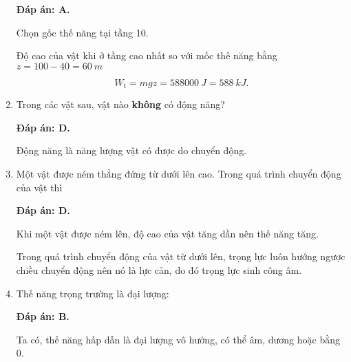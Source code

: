 \begin{enumerate}[label=\bfseries Câu \arabic*:, leftmargin=1.5cm]
	\hideall
	{	
		\textbf{Đáp án: A.}
		
		Chọn gốc thế năng tại tầng 10.
		
		Độ cao của vật khi ở tầng cao nhất so với mốc thế năng bằng $z = 100 - 40 = \SI{60}{m}$ 
		
		$$W_\text{t} = mgz = \SI{588000}{J} = \SI{588}{kJ}.$$
	}
	\item {}
	
	
	{Trong các vật sau, vật nào \textbf{không} có động năng?
	}
	
	\hideall
	{	
		\textbf{Đáp án: D.}
		
		Động năng là năng lượng vật có được do chuyển động.
	}
	\item {}
	
	
	{Một vật được ném thẳng đứng từ dưới lên cao. Trong quá trình chuyển động của vật thì
	}
	
	\hideall
	{	
		\textbf{Đáp án: D.}
		
		Khi một vật được ném lên, độ cao của vật tăng dần nên thế năng tăng.
		
		Trong quá trình chuyển động của vật từ dưới lên, trọng lực luôn hướng ngược chiều chuyển động nên nó là lực cản, do đó trọng lực sinh công âm.
	}
	\item {}
	
	
	{Thế năng trọng trường là đại lượng: 
	}
	
	\hideall
	{	
		\textbf{Đáp án: B.}
		
		Ta có, thế năng hấp dẫn là đại lượng vô hướng, có thể âm, dương hoặc bằng 0.
	}
\end{enumerate}


